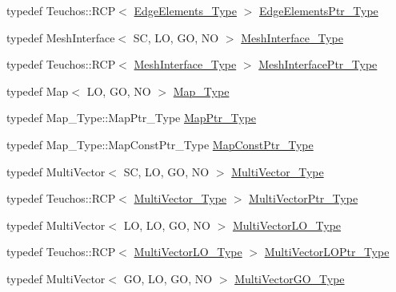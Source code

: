 \begin{DoxyCompactItemize}
\item 
typedef Teuchos\+::\+R\+CP$<$ \hyperlink{classFEDD_1_1RefinementFactory_a11b30196ff403358f3540117f09b6963}{Edge\+Elements\+\_\+\+Type} $>$ \hyperlink{classFEDD_1_1RefinementFactory_ae5285e990ec4632d6188a1280627ad13}{Edge\+Elements\+Ptr\+\_\+\+Type}
\item 
typedef Mesh\+Interface$<$ SC, LO, GO, NO $>$ \hyperlink{classFEDD_1_1RefinementFactory_aff8bb4cd3896a419c36d4baabccbf28a}{Mesh\+Interface\+\_\+\+Type}
\item 
typedef Teuchos\+::\+R\+CP$<$ \hyperlink{classFEDD_1_1RefinementFactory_aff8bb4cd3896a419c36d4baabccbf28a}{Mesh\+Interface\+\_\+\+Type} $>$ \hyperlink{classFEDD_1_1RefinementFactory_a2217802fcbb1342b135d33ea70411089}{Mesh\+Interface\+Ptr\+\_\+\+Type}
\item 
typedef Map$<$ LO, GO, NO $>$ \hyperlink{classFEDD_1_1RefinementFactory_ae3b9a462f8534ab43ce0dbf0d44b3bc5}{Map\+\_\+\+Type}
\item 
typedef Map\+\_\+\+Type\+::\+Map\+Ptr\+\_\+\+Type \hyperlink{classFEDD_1_1RefinementFactory_a554f7a4c5f5014e2ddec03a2e667016c}{Map\+Ptr\+\_\+\+Type}
\item 
typedef Map\+\_\+\+Type\+::\+Map\+Const\+Ptr\+\_\+\+Type \hyperlink{classFEDD_1_1RefinementFactory_a8256ccdf1b2a5c977ddc011f4e8eb8d3}{Map\+Const\+Ptr\+\_\+\+Type}
\item 
typedef Multi\+Vector$<$ SC, LO, GO, NO $>$ \hyperlink{classFEDD_1_1RefinementFactory_af7c4cb285d95e61820d63b9344a90976}{Multi\+Vector\+\_\+\+Type}
\item 
typedef Teuchos\+::\+R\+CP$<$ \hyperlink{classFEDD_1_1RefinementFactory_af7c4cb285d95e61820d63b9344a90976}{Multi\+Vector\+\_\+\+Type} $>$ \hyperlink{classFEDD_1_1RefinementFactory_a0592bb145b1f5b1daac2e69a96c23cb5}{Multi\+Vector\+Ptr\+\_\+\+Type}
\item 
typedef Multi\+Vector$<$ LO, LO, GO, NO $>$ \hyperlink{classFEDD_1_1RefinementFactory_ae731f05f6a28d13f917230f914f29037}{Multi\+Vector\+L\+O\+\_\+\+Type}
\item 
typedef Teuchos\+::\+R\+CP$<$ \hyperlink{classFEDD_1_1RefinementFactory_ae731f05f6a28d13f917230f914f29037}{Multi\+Vector\+L\+O\+\_\+\+Type} $>$ \hyperlink{classFEDD_1_1RefinementFactory_a002c7179ca2f22db4505da2db0f798e9}{Multi\+Vector\+L\+O\+Ptr\+\_\+\+Type}
\item 
typedef Multi\+Vector$<$ GO, LO, GO, NO $>$ \hyperlink{classFEDD_1_1RefinementFactory_a433fd79c1903a3771cffbaed6f5dbd71}{Multi\+Vector\+G\+O\+\_\+\+Type}
\item 

\end{DoxyCompactItemize}
